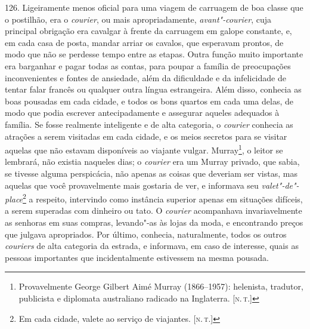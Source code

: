 126. Ligeiramente menos oficial para uma viagem de carruagem de boa
classe que o postilhão, era o \emph{courier}, ou mais apropriadamente,
\emph{avant"-courier}, cuja principal obrigação era cavalgar à frente da
carruagem em galope constante, e, em cada casa de posta, mandar arriar
os cavalos, que esperavam prontos, de modo que não se perdesse tempo
entre as etapas. Outra função muito importante era barganhar e pagar
todas as contas, para poupar a família de preocupações inconvenientes e
fontes de ansiedade, além da dificuldade e da infelicidade de tentar
falar francês ou qualquer outra língua estrangeira. Além disso, conhecia
as boas pousadas em cada cidade, e todos os bons quartos em cada uma
delas, de modo que podia escrever antecipadamente e assegurar aqueles
adequados à família. Se fosse realmente inteligente e de alta categoria,
o \emph{courier} conhecia as atrações a serem visitadas em cada cidade,
e os meios secretos para se visitar aquelas que não estavam disponíveis
ao viajante vulgar. Murray\footnote{Provavelmente George Gilbert Aimé
  Murray (1866--1957): helenista, tradutor, publicista e diplomata
  australiano radicado na Inglaterra. {[}\textsc{n.\,t.}{]}}, o leitor se
lembrará, não existia naqueles dias; o \emph{courier} era um Murray
privado, que sabia, se tivesse alguma perspicácia, não apenas as coisas
que deveriam ser vistas, mas aquelas que você provavelmente mais
gostaria de ver, e informava seu \emph{valet"-de"-place}\footnote{Em cada
  cidade, valete ao serviço de viajantes. {[}\textsc{n.\,t.}{]}} a respeito,
intervindo como instância superior apenas em situações difíceis, a serem
superadas com dinheiro ou tato. O \emph{courier} acompanhava
invariavelmente as senhoras em suas compras, levando"-as às lojas da
moda, e encontrando preços que julgava apropriados. Por último,
conhecia, naturalmente, todos os outros \emph{couriers} de alta
categoria da estrada, e informava, em caso de interesse, quais as
pessoas importantes que incidentalmente estivessem na mesma pousada.

